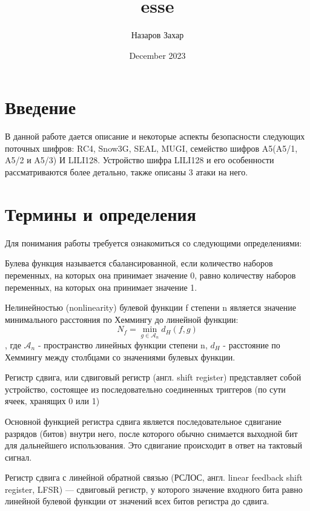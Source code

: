\documentclass[colorthm]{./civarticle}
\title{esse}
\author{Назаров Захар}
\date{December 2023}
\begin{document}
\section{Введение}

В данной работе дается описание и некоторые аспекты безопасности следующих поточных шифров: RC4, Snow3G, SEAL, MUGI, семейство шифров A5(A5/1, A5/2 и A5/3) И LILI128. Устройство шифра LILI128 и его особенности рассматриваются более детально, также описаны 3 атаки на него.

\section{Термины и определения}

Для понимания работы требуется ознакомиться со следующими определениями:

\begin{definition}
  Булева функция называется сбалансированной, если количество наборов переменных, на которых она принимает значение 0, равно количеству наборов переменных, на которых она принимает значение 1.
\end{definition}

\begin{definition}
  Нелинейностью (nonlinearity) булевой функции f степени n является значение минимального расстояния по Хеммингу до линейной функции:
  \begin{equation}
      N_f=\min _{g \in \mathcal{A}_n} d_H(f, g)
  \end{equation}
  , где $\mathcal{A}_n$ - пространство линейных функции степени n, $d_H$ - расстояние по Хеммингу между столбцами со значениями булевых функции.
\end{definition}

\begin{definition}
  Регистр сдвига, или сдвиговый регистр (англ. shift register) представляет собой устройство, состоящее из последовательно соединенных триггеров (по сути ячеек, хранящих 0 или 1)
\end{definition}

Основной функцией регистра сдвига является последовательное сдвигание разрядов (битов)  внутри него, после которого обычно снимается выходной бит для дальнейшего использования. Это сдвигание происходит в ответ на тактовый сигнал.

\begin{definition}
  Регистр сдвига с линейной обратной связью (РСЛОС, англ. linear feedback shift register, LFSR) — сдвиговый регистр, у которого значение входного бита равно линейной булевой функции от значений всех битов регистра до сдвига.
\end{definition}
\end{document}
